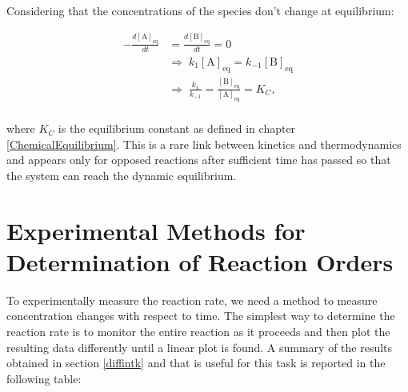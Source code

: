\documentclass[
  9pt,
]{extbook}
\theoremstyle{definition}
\theoremstyle{definition}
\theoremstyle{definition}
\theoremstyle{remark}
\begin{document}
Considering that the concentrations of the species don't change at equilibrium:

\begin{equation}
\begin{aligned}
-\frac{d[\mathrm{A}]_{\mathrm{eq}}}{dt} &= \frac{d[\mathrm{B}]_{\mathrm{eq}}}{dt} = 0\\
& \Rightarrow \; k_1[\mathrm{A}]_{\mathrm{eq}} = k_{-1}[\mathrm{B}]_{\mathrm{eq}} \\
& \Rightarrow \;  \frac{k_1}{k_{-1}} =  \frac{[\mathrm{B}]_{\mathrm{eq}}}{[\mathrm{A}]_{\mathrm{eq}}} = K_C, \\
\end{aligned}
\label{eq:kinopp4}
\end{equation}

where \(K_C\) is the equilibrium constant as defined in chapter \ref{ChemicalEquilibrium}. This is a rare link between kinetics and thermodynamics and appears only for opposed reactions after sufficient time has passed so that the system can reach the dynamic equilibrium.

\hypertarget{experimental-methods-for-determination-of-reaction-orders}{%
\section{Experimental Methods for Determination of Reaction Orders}\label{experimental-methods-for-determination-of-reaction-orders}}

To experimentally measure the reaction rate, we need a method to measure concentration changes with respect to time. The simplest way to determine the reaction rate is to monitor the entire reaction as it proceeds and then plot the resulting data differently until a linear plot is found. A summary of the results obtained in section \ref{diffintk} and that is useful for this task is reported in the following table:

\tiny
\end{document}

